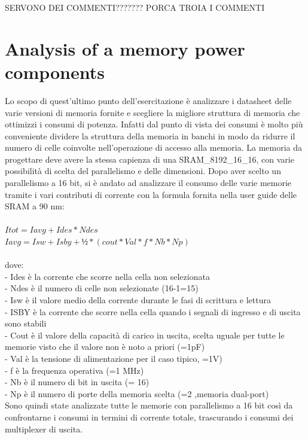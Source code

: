 SERVONO DEI COMMENTI??????? PORCA TROIA I COMMENTI

\section{Analysis of a memory power components}
Lo scopo di quest’ultimo punto dell’esercitazione è  analizzare i datasheet delle varie versioni di memoria fornite e scegliere la migliore struttura di memoria che ottimizzi i consumi di potenza. Infatti dal punto di vista dei consumi è molto più conveniente dividere la struttura della memoria in banchi in modo da ridurre il numero di celle coinvolte nell’operazione di accesso alla memoria. 
La memoria da progettare deve avere la stessa capienza di una SRAM\_8192\_16\_16, con varie possibilità di scelta del parallelismo e delle dimensioni.
Dopo aver scelto un parallelismo a 16 bit, si è andato ad analizzare il consumo delle varie memorie tramite i vari contributi di corrente con la formula fornita nella user guide delle SRAM a 90 nm:
\\
\\
$Itot= Iavg+Ides*Ndes$
\\
$Iavg=Isw+Isby+½*(cout*Val*f*Nb*Np)$
\\
\\
dove:
\\
- Ides è la corrente che scorre nella cella non selezionata\\
- Ndes è il numero di celle non selezionate (16-1=15)\\
- Isw è il valore medio della corrente durante le fasi di scrittura e lettura\\
- ISBY è la corrente che scorre nella cella quando i segnali di ingresso e di uscita sono stabili\\
- Cout è il valore della capacità di carico in uscita, scelta uguale per tutte le memorie visto che il valore non è noto a priori (=1pF)\\
- Val è la tensione di alimentazione per il caso tipico, =1V)\\
- f è la frequenza operativa (=1 MHz)\\
- Nb è il numero di bit in uscita (= 16)\\
- Np è il numero di porte della memoria scelta (=2 ,memoria dual-port)\\
Sono quindi state analizzate tutte le memorie con parallelismo a 16 bit così da confrontarne i consumi in termini di corrente totale, trascurando i consumi dei multiplexer di uscita.
\\
